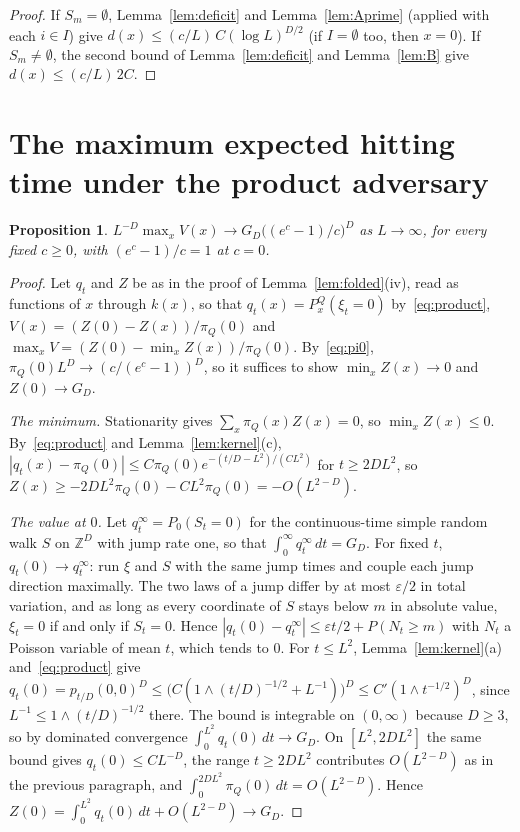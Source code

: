 \documentclass[11pt]{amsart}
\newtheorem{proposition}[theorem]{Proposition}
\theoremstyle{remark}
\newcommand{\eps}{\varepsilon}
\newcommand{\Z}{\mathbb{Z}}
\begin{document}
\begin{proof}
If $S_m=\emptyset$, Lemma~\ref{lem:deficit} and Lemma~\ref{lem:Aprime} (applied with each $i\in I$) give
$d(x)\le(c/L)\,C(\log L)^{D/2}$ (if $I=\emptyset$ too, then $x=0$). If $S_m\ne\emptyset$, the second
bound of Lemma~\ref{lem:deficit} and Lemma~\ref{lem:B} give $d(x)\le(c/L)\,2C$.
\end{proof}

\section{The maximum expected hitting time under the product adversary}\label{sec:value}

\begin{proposition}\label{prop:value}
$L^{-D}\max_xV(x)\to G_D\bigl((e^c-1)/c\bigr)^D$ as $L\to\infty$, for every fixed $c\ge0$, with $(e^c-1)/c=1$ at $c=0$.
\end{proposition}

\begin{proof}
Let $q_t$ and $Z$ be as in the proof of Lemma~\ref{lem:folded}(iv), read as functions of $x$ through $k(x)$, so that
$q_t(x)=P^Q_x(\xi_t=0)$ by~\eqref{eq:product}, $V(x)=(Z(0)-Z(x))/\pi_Q(0)$ and $\max_xV=(Z(0)-\min_xZ(x))/\pi_Q(0)$. By~\eqref{eq:pi0},
$\pi_Q(0)L^D\to(c/(e^c-1))^D$, so it suffices to show $\min_xZ(x)\to0$ and $Z(0)\to G_D$.

\emph{The minimum.} Stationarity gives $\sum_x\pi_Q(x)Z(x)=0$, so $\min_xZ(x)\le0$. By~\eqref{eq:product} and
Lemma~\ref{lem:kernel}(c), $|q_t(x)-\pi_Q(0)|\le C\pi_Q(0)e^{-(t/D-L^2)/(CL^2)}$ for $t\ge2DL^2$, so
$Z(x)\ge-2DL^2\pi_Q(0)-CL^2\pi_Q(0)=-O(L^{2-D})$.

\emph{The value at $0$.} Let $q^\infty_t=P_0(S_t=0)$ for the continuous-time simple random walk $S$ on $\Z^D$ with jump
rate one, so that $\int_0^\infty q^\infty_t\,dt=G_D$. For fixed $t$, $q_t(0)\to q^\infty_t$: run $\xi$ and $S$ with the same
jump times and couple each jump direction maximally. The two laws of a jump differ by at most $\eps/2$ in total
variation, and as long as every coordinate of $S$ stays below $m$ in absolute value, $\xi_t=0$ if and only if $S_t=0$.
Hence $|q_t(0)-q^\infty_t|\le\eps t/2+P(N_t\ge m)$ with $N_t$ a Poisson variable of mean $t$, which tends to $0$. For
$t\le L^2$, Lemma~\ref{lem:kernel}(a) and~\eqref{eq:product} give
$q_t(0)=p_{t/D}(0,0)^D\le\bigl(C(1\wedge(t/D)^{-1/2}+L^{-1})\bigr)^D\le C'(1\wedge t^{-1/2})^D$, since $L^{-1}\le1\wedge(t/D)^{-1/2}$
there. The bound is integrable on $(0,\infty)$ because $D\ge3$, so by dominated convergence
$\int_0^{L^2}q_t(0)\,dt\to G_D$. On $[L^2,2DL^2]$ the same bound gives $q_t(0)\le CL^{-D}$, the range $t\ge2DL^2$
contributes $O(L^{2-D})$ as in the previous paragraph, and $\int_0^{2DL^2}\pi_Q(0)\,dt=O(L^{2-D})$. Hence
$Z(0)=\int_0^{L^2}q_t(0)\,dt+O(L^{2-D})\to G_D$.
\end{proof}
\end{document}
